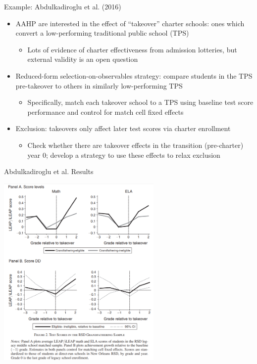 \documentclass[11pt, english]{beamer}
\begin{document}
	\begin{frame}{Example: Abdulkadiroglu et al. (2016)}
		\begin{itemize}
			\item AAHP are interested in the effect of ``takeover'' charter schools:
				ones which convert a low-performing traditional public school (TPS)
				\smallskip
				\begin{itemize}
					\item Lots of evidence of charter effectiveness from admission lotteries,
						but external validity is an open question
				\end{itemize}
				\bigskip
				\pause{}

			\item Reduced-form selection-on-observables strategy: compare students in
				the TPS pre-takeover to others in similarly low-performing TPS
				\smallskip
				\begin{itemize}
					\item Specifically, match each takeover school to a TPS using baseline
						test score performance and control for match cell fixed effects
				\end{itemize}
				\bigskip
				\pause{}

			\item Exclusion: takeovers only affect later test scores via charter
				enrollment
				\smallskip
				\begin{itemize}
					\item Check whether there are takeover effects in the transition (pre-charter)
						year 0; develop a strategy to use these effects to relax exclusion
				\end{itemize}
		\end{itemize}
	\end{frame}

	\begin{frame}{ Abdulkadiroglu et al. Results}
		\begin{center}
			\includegraphics[width=0.6\textwidth]{figures/aahp.png}
		\end{center}
	\end{frame}
\end{document}
